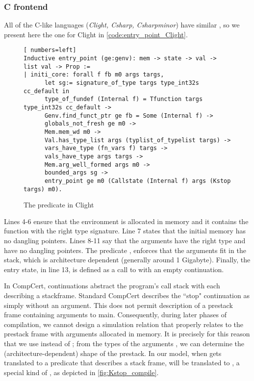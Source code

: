 \subsubsection{C frontend}
All of the C-like languages (\emph{Clight, Csharp, Csharpminor}) have similar , so we present here the one for Clight in \autoref{code:entry_point_Clight}.
\begin{figure}
\begin{lstlisting}[ numbers=left]
Inductive entry_point (ge:genv): mem -> state -> val -> list val -> Prop :=
| initi_core: forall f fb m0 args targs,
      let sg:= signature_of_type targs type_int32s cc_default in
      type_of_fundef (Internal f) = Tfunction targs type_int32s cc_default ->
      Genv.find_funct_ptr ge fb = Some (Internal f) ->
      globals_not_fresh ge m0 ->
      Mem.mem_wd m0 ->
      Val.has_type_list args (typlist_of_typelist targs) ->
      vars_have_type (fn_vars f) targs ->
      vals_have_type args targs ->
      Mem.arg_well_formed args m0 ->
      bounded_args sg ->
      entry_point ge m0 (Callstate (Internal f) args (Kstop targs) m0).
\end{lstlisting}
\caption{The  predicate in Clight}\label{code:entry_point_Clight}
\end{figure}
Lines 4-6 ensure that the environment is allocated in memory and it contains the function  with the right type signature. Line 7 states that the initial memory has no dangling pointers. Lines 8-11 say that the arguments have the right type and have no dangling pointers. The predicate , enforces that the arguments fit in the stack, which is architecture dependent (generally around 1 Gigabyte). Finally, the entry state, in line 13, is defined as a call to  with an empty continuation.

In CompCert, continuations abstract the program's call stack with each  describing a stackframe. Standard CompCert describes the ``stop" continuation as simply  without an argument.  This does not permit description of a prestack frame containing arguments to main.  Consequently, during later phases of compilation, we cannot design a simulation relation that properly relates  to the prestack frame with arguments allocated in memory.  It is precisely for this reason that we use  instead of ; from the types of the arguments , we can determine the (architecture-dependent) shape of the prestack. In our model, when  gets translated to a predicate  that describes a stack frame,  will be translated to , a special kind of , as depicted in \autoref{fig:Kstop_compile}.

